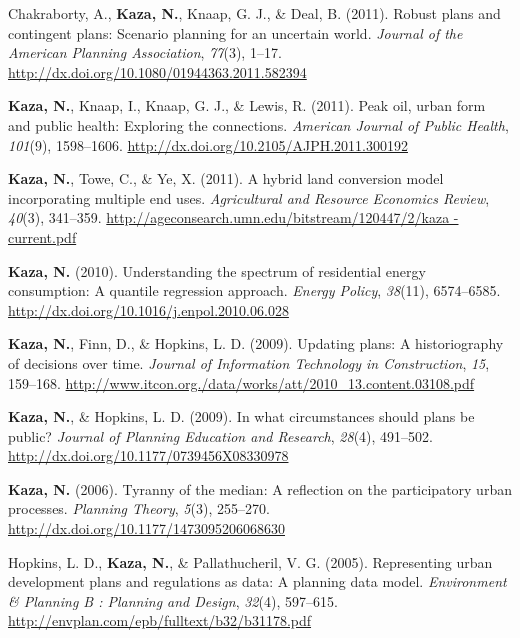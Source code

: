 \documentclass[11pt,a4paper,]{awesome-cv}
\newlength{\cslhangindent}
\newenvironment{CSLReferences}[2] %
 {\begin{list}{}{%
  \setlength{\itemindent}{0pt}
  \setlength{\leftmargin}{0pt}
  \setlength{\parsep}{0pt}
  \ifodd #1
   \setlength{\leftmargin}{\cslhangindent}
   \setlength{\itemindent}{-1\cslhangindent}
  \fi
  \setlength{\itemsep}{#2\baselineskip}}}
 {\end{list}}
\begin{document}
\begin{CSLReferences}{1}{0}
Chakraborty, A., \textbf{Kaza, N.}, Knaap, G. J., \& Deal, B. (2011).
Robust plans and contingent plans: Scenario planning for an uncertain
world. \emph{Journal of the American Planning Association},
\emph{77}(3), 1--17.
\url{http://dx.doi.org/10.1080/01944363.2011.582394}

\textbf{Kaza, N.}, Knaap, I., Knaap, G. J., \& Lewis, R. (2011). Peak
oil, urban form and public health: Exploring the connections.
\emph{American Journal of Public Health}, \emph{101}(9), 1598--1606.
\url{http://dx.doi.org/10.2105/AJPH.2011.300192}

\textbf{Kaza, N.}, Towe, C., \& Ye, X. (2011). A hybrid land conversion
model incorporating multiple end uses. \emph{Agricultural and Resource
Economics Review}, \emph{40}(3), 341--359.
\href{http://ageconsearch.umn.edu/bitstream/120447/2/kaza\%20-\%20current.pdf}{http://ageconsearch.umn.edu/bitstream/120447/2/kaza
- current.pdf}

\textbf{Kaza, N.} (2010). Understanding the spectrum of residential
energy consumption: A quantile regression approach. \emph{Energy
Policy}, \emph{38}(11), 6574--6585.
\url{http://dx.doi.org/10.1016/j.enpol.2010.06.028}

\textbf{Kaza, N.}, Finn, D., \& Hopkins, L. D. (2009). Updating plans: A
historiography of decisions over time. \emph{Journal of Information
Technology in Construction}, \emph{15}, 159--168.
\url{http://www.itcon.org./data/works/att/2010_13.content.03108.pdf}

\textbf{Kaza, N.}, \& Hopkins, L. D. (2009). In what circumstances
should plans be public? \emph{Journal of Planning Education and
Research}, \emph{28}(4), 491--502.
\url{http://dx.doi.org/10.1177/0739456X08330978}

\textbf{Kaza, N.} (2006). Tyranny of the median: A reflection on the
participatory urban processes. \emph{Planning Theory}, \emph{5}(3),
255--270. \url{http://dx.doi.org/10.1177/1473095206068630}

Hopkins, L. D., \textbf{Kaza, N.}, \& Pallathucheril, V. G. (2005).
Representing urban development plans and regulations as data: A planning
data model. \emph{Environment \& Planning B : Planning and Design},
\emph{32}(4), 597--615.
\url{http://envplan.com/epb/fulltext/b32/b31178.pdf}

\end{CSLReferences}
\end{document}
